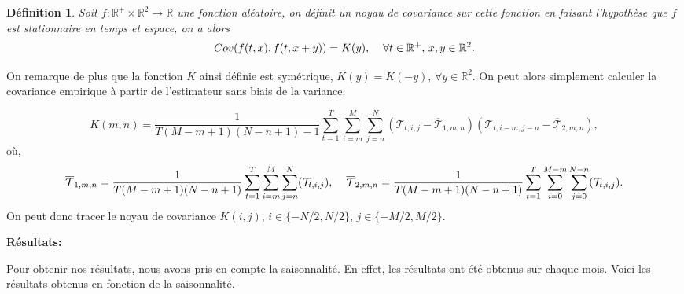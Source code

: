 \documentclass[a4paper,10pt]{article}
\newtheorem{definition}{Définition}
\begin{document}
\begin{definition}
	Soit $f:\mathbb{R}^{+}\times\mathbb{R}^2\to \mathbb{R}$ une fonction aléatoire, on définit un noyau de covariance sur cette fonction en faisant l'hypothèse que $f$ est stationnaire en temps et espace, on a alors
	\[Cov(f(t,x),f(t,x+y))=K(y), \hspace{4mm} \forall t \in \mathbb{R}^{+},\,x,y \in \mathbb{R}^2. \] 
\end{definition}
On remarque de plus que la fonction $K$ ainsi définie est symétrique, $K(y)=K(-y),\, \forall y \in \mathbb{R}^2$. On peut alors simplement calculer la covariance empirique à partir de l'estimateur sans biais de la variance.

\[K(m,n)=\frac{1}{T(M-m+1)(N-n+1)-1}\sum_{t=1}^{T}\sum_{i=m}^{M}\sum_{j=n}^{N}(\mathcal{T}_{t,i,j}-\overline{\mathcal{T}}_{1,m,n})(\mathcal{T}_{t,i-m,j-n}-\overline{\mathcal{T}}_{2,m,n}),\]
où,
\[\overline{\mathcal{T}}_{1,m,n}=\frac{1}{T(M-m+1)(N-n+1)}\sum_{t=1}^{T}\sum_{i=m}^{M}\sum_{j=n}^{N}(\mathcal{T}_{t,i,j}), \hspace{4mm}\overline{\mathcal{T}}_{2,m,n}=\frac{1}{T(M-m+1)(N-n+1)}\sum_{t=1}^{T}\sum_{i=0}^{M-m}\sum_{j=0}^{N-n}(\mathcal{T}_{t,i,j}).\]
On peut donc tracer le noyau de covariance $K(i,j)$, $i \in\{-N/2,N/2\}$, $j \in \{-M/2,M/2\}$. 

\noindent \textbf{Résultats:}

Pour obtenir nos résultats, nous avons pris en compte la saisonnalité. En effet, les résultats ont été obtenus sur chaque mois. Voici les résultats obtenus en fonction de la saisonnalité.
\end{document}
